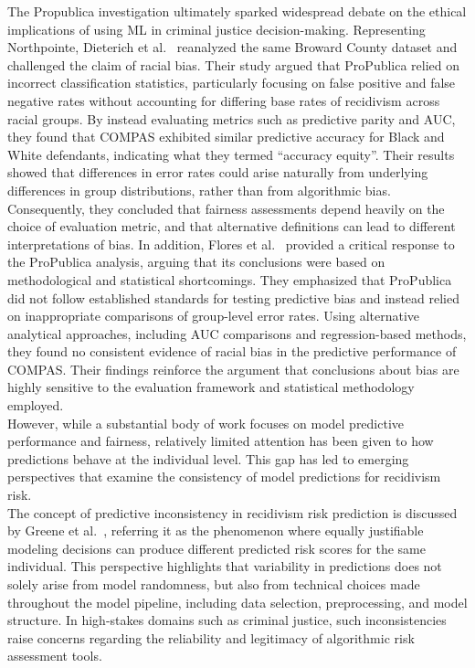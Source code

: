 \documentclass[12pt]{article}
\begin{document}
The Propublica investigation ultimately sparked widespread debate on the ethical implications of using ML in criminal justice decision-making. Representing Northpointe, Dieterich et al.~\cite{dieterich2016compas} reanalyzed the same Broward County dataset and challenged the claim of racial bias. Their study argued that ProPublica relied on incorrect classification statistics, particularly focusing on false positive and false negative rates without accounting for differing base rates of recidivism across racial groups. By instead evaluating metrics such as predictive parity and AUC, they found that COMPAS exhibited similar predictive accuracy for Black and White defendants, indicating what they termed ``accuracy equity''. Their results showed that differences in error rates could arise naturally from underlying differences in group distributions, rather than from algorithmic bias. Consequently, they concluded that fairness assessments depend heavily on the choice of evaluation metric, and that alternative definitions can lead to different interpretations of bias. In addition, Flores et al.~\cite{flores2016false} provided a critical response to the ProPublica analysis, arguing that its conclusions were based on methodological and statistical shortcomings. They emphasized that ProPublica did not follow established standards for testing predictive bias and instead relied on inappropriate comparisons of group-level error rates. Using alternative analytical approaches, including AUC comparisons and regression-based methods, they found no consistent evidence of racial bias in the predictive performance of COMPAS. Their findings reinforce the argument that conclusions about bias are highly sensitive to the evaluation framework and statistical methodology employed.\\

However, while a substantial body of work focuses on model predictive performance and fairness, relatively limited attention has been given to how predictions behave at the individual level. This gap has led to emerging perspectives that examine the consistency of model predictions for recidivism risk.\\

The concept of predictive inconsistency in recidivism risk prediction is discussed by Greene et al.~\cite{greene2022forks}, referring it as the  phenomenon where equally justifiable modeling decisions can produce different predicted risk scores for the same individual. This perspective highlights that variability in predictions does not solely arise from model randomness, but also from technical choices made throughout the model pipeline, including data selection, preprocessing, and model structure. In high-stakes domains such as criminal justice, such inconsistencies raise concerns regarding the reliability and legitimacy of algorithmic risk assessment tools.\\
\end{document}
